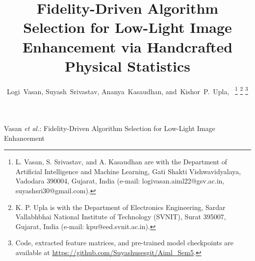 \documentclass[journal]{IEEEtran}
\begin{document}
\title{Fidelity-Driven Algorithm Selection for Low-Light Image Enhancement via Handcrafted Physical Statistics}

\author{Logi~Vasan,
        Suyash~Srivastav,
        Ananya~Kasaudhan,
        and~Kishor~P.~Upla,~%
\thanks{L. Vasan, S. Srivastav, and A. Kasaudhan are with the Department of Artificial Intelligence and Machine Learning, Gati Shakti Vishwavidyalaya, Vadodara 390004, Gujarat, India (e-mail: logivasan.aiml22@gsv.ac.in, suyashsri30@gmail.com).}%
\thanks{K. P. Upla is with the Department of Electronics Engineering, Sardar Vallabhbhai National Institute of Technology (SVNIT), Surat 395007, Gujarat, India (e-mail: kpu@eed.svnit.ac.in).}%
\thanks{Code, extracted feature matrices, and pre-trained model checkpoints are available at \url{https://github.com/Suyashusesgit/Aiml_Sem5}.}%
}

%
{Vasan \MakeLowercase{\textit{et al.}}: Fidelity-Driven Algorithm Selection for Low-Light Image Enhancement}

\maketitle
\end{document}
